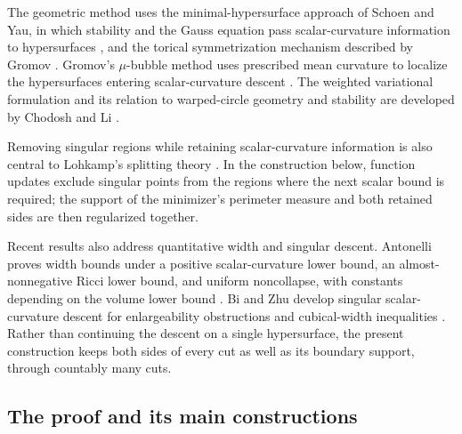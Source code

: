 The geometric method uses the minimal-hypersurface approach of Schoen
and Yau, in which stability and the Gauss equation pass scalar-curvature
information to hypersurfaces \citep[Section~1]{schoenYau1979Structure},
and the torical symmetrization mechanism described by Gromov
\citep[Section~2]{gromov2018Metric}. Gromov's \(\mu\)-bubble method
uses prescribed mean curvature to localize the hypersurfaces entering
scalar-curvature descent \citep[\S\(5\frac56\)]{gromov1996}.
The weighted variational formulation and its relation to warped-circle
geometry and stability are developed by Chodosh and Li
\citep[Section~3 and Remark~11]{chodoshLi}.

Removing singular regions while retaining scalar-curvature information
is also central to Lohkamp's splitting theory
\citep[\S1.2 and Theorem~3.15]{lohkamp2022SplittingsII}.
In the construction below, function updates exclude singular points from
the regions where the next scalar bound is required; the support of the
minimizer's perimeter measure and both retained sides are then regularized together.

Recent results also address quantitative width and singular descent.
Antonelli proves width bounds under a positive scalar-curvature lower
bound, an almost-nonnegative Ricci lower bound, and uniform noncollapse,
with constants depending on the volume lower bound
\citep[Theorem~1.4]{antonelli2026Volume}.
Bi and Zhu develop singular scalar-curvature descent for enlargeability
obstructions and cubical-width inequalities
\citep[Theorem~B and Section~4]{biZhu2026}.
Rather than continuing the descent on a single hypersurface, the present
construction keeps both sides of every cut as well as its boundary support, through
countably many cuts.

\subsection{The proof and its main constructions}

